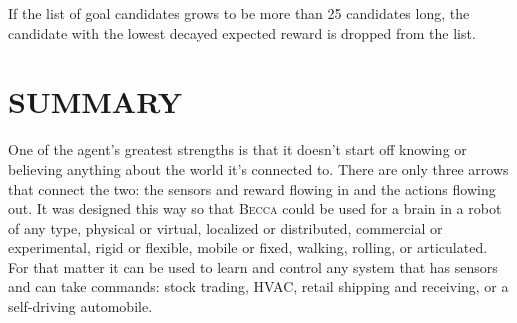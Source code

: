 \documentclass[oneside,twocolumn]{article}
\begin{document}
If the list of goal candidates grows to be more than 25 candidates long, the candidate with the lowest decayed expected reward is dropped from the list.  

 

\section*{\color{copper} SUMMARY}

One of the agent's greatest strengths is that it doesn't start off knowing or believing anything about the world it's connected to. There are only three arrows that connect the two: the sensors and reward flowing in and the actions flowing out. It was designed this way so that \textsc{Becca} could be used for a brain in a robot of any type, physical or virtual, localized or distributed, commercial or experimental, rigid or flexible, mobile or fixed, walking, rolling, or articulated. For that matter it can be used to learn and control any system that has sensors and can take commands: stock trading, HVAC, retail shipping and receiving, or a self-driving  automobile.




%
%
\end{document}
